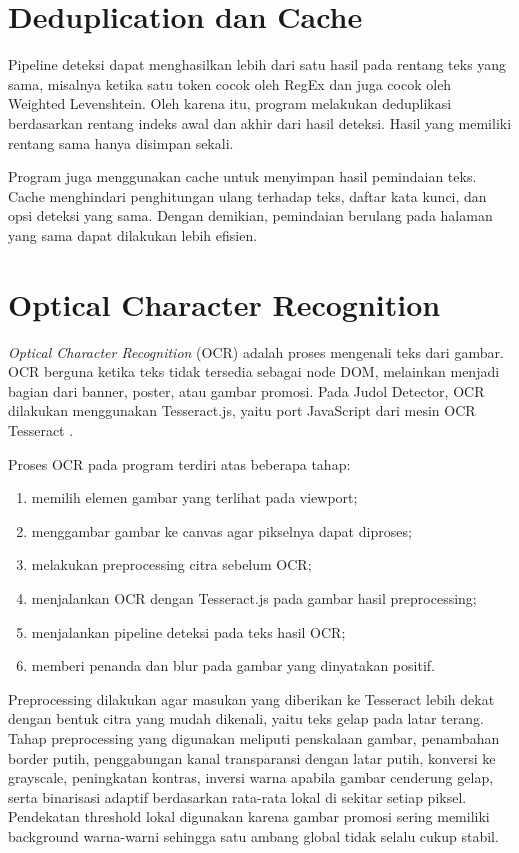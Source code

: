 \section{Deduplication dan Cache}

Pipeline deteksi dapat menghasilkan lebih dari satu hasil pada rentang teks
yang sama, misalnya ketika satu token cocok oleh RegEx dan juga cocok oleh
Weighted Levenshtein. Oleh karena itu, program melakukan deduplikasi berdasarkan
rentang indeks awal dan akhir dari hasil deteksi. Hasil yang memiliki rentang
sama hanya disimpan sekali.

Program juga menggunakan cache untuk menyimpan hasil pemindaian teks. Cache
menghindari penghitungan ulang terhadap teks, daftar kata kunci, dan opsi
deteksi yang sama. Dengan demikian, pemindaian berulang pada halaman yang sama
dapat dilakukan lebih efisien.

\section{Optical Character Recognition}

\textit{Optical Character Recognition} (OCR) adalah proses mengenali teks dari
gambar. OCR berguna ketika teks tidak tersedia sebagai node DOM, melainkan
menjadi bagian dari banner, poster, atau gambar promosi. Pada Judol Detector,
OCR dilakukan menggunakan Tesseract.js, yaitu port JavaScript dari mesin OCR
Tesseract \cite{tesseractjs}.

Proses OCR pada program terdiri atas beberapa tahap:

\begin{enumerate}
    \item memilih elemen gambar yang terlihat pada viewport;
    \item menggambar gambar ke canvas agar pikselnya dapat diproses;
    \item melakukan preprocessing citra sebelum OCR;
    \item menjalankan OCR dengan Tesseract.js pada gambar hasil preprocessing;
    \item menjalankan pipeline deteksi pada teks hasil OCR;
    \item memberi penanda dan blur pada gambar yang dinyatakan positif.
\end{enumerate}

Preprocessing dilakukan agar masukan yang diberikan ke Tesseract lebih dekat
dengan bentuk citra yang mudah dikenali, yaitu teks gelap pada latar terang.
Tahap preprocessing yang digunakan meliputi penskalaan gambar, penambahan
border putih, penggabungan kanal transparansi dengan latar putih, konversi ke
grayscale, peningkatan kontras, inversi warna apabila gambar cenderung gelap,
serta binarisasi adaptif berdasarkan rata-rata lokal di sekitar setiap piksel.
Pendekatan threshold lokal digunakan karena gambar promosi sering memiliki
background warna-warni sehingga satu ambang global tidak selalu cukup stabil.

